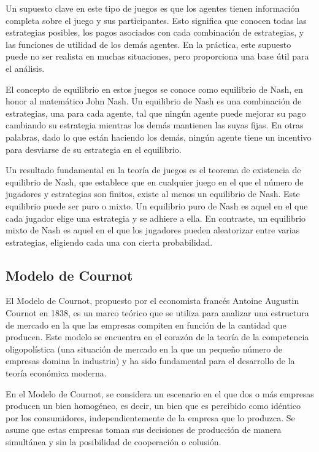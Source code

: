 Un supuesto clave en este tipo de juegos es que los agentes tienen información completa sobre el juego y sus participantes. Esto significa que conocen todas las estrategias posibles, los pagos asociados con cada combinación de estrategias, y las funciones de utilidad de los demás agentes. En la práctica, este supuesto puede no ser realista en muchas situaciones, pero proporciona una base útil para el análisis.
\vspace{2.5mm}

El concepto de equilibrio en estos juegos se conoce como equilibrio de Nash, en honor al matemático John Nash. Un equilibrio de Nash es una combinación de estrategias, una para cada agente, tal que ningún agente puede mejorar su pago cambiando su estrategia mientras los demás mantienen las suyas fijas. En otras palabras, dado lo que están haciendo los demás, ningún agente tiene un incentivo para desviarse de su estrategia en el equilibrio.
\vspace{2.5mm}

Un resultado fundamental en la teoría de juegos es el teorema de existencia de equilibrio de Nash, que establece que en cualquier juego en el que el número de jugadores y estrategias son finitos, existe al menos un equilibrio de Nash. Este equilibrio puede ser puro o mixto. Un equilibrio puro de Nash es aquel en el que cada jugador elige una estrategia y se adhiere a ella. En contraste, un equilibrio mixto de Nash es aquel en el que los jugadores pueden aleatorizar entre varias estrategias, eligiendo cada una con cierta probabilidad.
\vspace{2.5mm}

\subsection{Modelo de Cournot}\label{C262}
El Modelo de Cournot, propuesto por el economista francés Antoine Augustin Cournot en 1838, es un marco teórico que se utiliza para analizar una estructura de mercado en la que las empresas compiten en función de la cantidad que producen. Este modelo se encuentra en el corazón de la teoría de la competencia oligopolística (una situación de mercado en la que un pequeño número de empresas domina la industria) y ha sido fundamental para el desarrollo de la teoría económica moderna.
\vspace{2.5mm}

En el Modelo de Cournot, se considera un escenario en el que dos o más empresas producen un bien homogéneo, es decir, un bien que es percibido como idéntico por los consumidores, independientemente de la empresa que lo produzca. Se asume que estas empresas toman sus decisiones de producción de manera simultánea y sin la posibilidad de cooperación o colusión.
\vspace{2.5mm}

